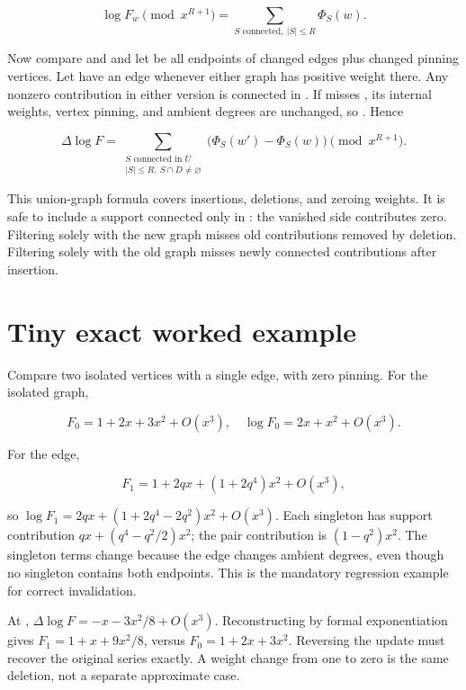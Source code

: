 \documentclass[
  11pt,
  a4paper,
]{report}
\let\nxtexttt\texttt
\renewcommand{\texttt}[1]{\nxtexttt{\seqsplit{#1}}}
\begin{document}
\[
\log F_w\pmod{x^{R+1}}=\sum_{S\text{ connected},\ |S|\le R}\Phi_S(w).
\]

Now compare \texttt{w} and \texttt{w\textquotesingle{}} and let
\texttt{D} be all endpoints of changed edges plus changed pinning
vertices. Let \texttt{U} have an edge whenever either graph has positive
weight there. Any nonzero contribution in either version is connected in
\texttt{U}. If \texttt{S} misses \texttt{D}, its internal weights,
vertex pinning, and ambient degrees are unchanged, so
\texttt{Phi\_S(w\textquotesingle{})=Phi\_S(w)}. Hence

\[
\Delta\log F=\sum_{\substack{S\text{ connected in }U\\|S|\le R,\ S\cap D\ne\varnothing}}\bigl(\Phi_S(w')-\Phi_S(w)\bigr)\pmod{x^{R+1}}.
\]

This union-graph formula covers insertions, deletions, and zeroing
weights. It is safe to include a support connected only in \texttt{U}:
the vanished side contributes zero. Filtering solely with the new graph
misses old contributions removed by deletion. Filtering solely with the
old graph misses newly connected contributions after insertion.

\hypertarget{tiny-exact-worked-example-1}{%
\section{Tiny exact worked example}\label{tiny-exact-worked-example-1}}

Compare two isolated vertices with a single edge, with zero pinning. For
the isolated graph,

\[
F_0=1+2x+3x^2+O(x^3),\quad \log F_0=2x+x^2+O(x^3).
\]

For the edge,

\[
F_1=1+2qx+(1+2q^4)x^2+O(x^3),
\]

so \(\log F_1=2q x+(1+2q^{4}-2q^{2})x^{2}+O(x^{3})\). Each singleton has
support contribution \(q x+(q^{4}-q^{2}/2)x^{2}\); the pair contribution
is \((1-q^{2})x^{2}\). The singleton terms change because the edge
changes ambient degrees, even though no singleton contains both
endpoints. This is the mandatory regression example for correct
invalidation.

At \texttt{q=1/2}, \(\Delta \log F=-x-3x^{2}/8+O(x^{3})\).
Reconstructing by formal exponentiation gives \(F_1=1+x+9x^{2}/8\),
versus \(F_0=1+2x+3x^{2}\). Reversing the update must recover the
original series exactly. A weight change from one to zero is the same
deletion, not a separate approximate case.
\end{document}
